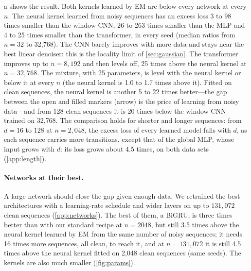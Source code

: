 \documentclass{article}
\begin{document}
a shows the result. Both kernels learned by EM are below every network at every $n$. The neural kernel
learned from noisy sequences has an excess loss 3 to 98 times smaller than the window CNN, 26 to 263 times smaller than
the MLP and 4 to 25 times smaller than the transformer, in every seed (median ratios from $n=32$ to 32{,}768). The CNN
barely improves with more data and stays near the best linear denoiser: this is the locality limit of
\cref{sec:gaussian}. The transformer improves up to $n=8{,}192$ and then levels off, 25 times above the neural kernel at
$n=32{,}768$. The mixture, with 25 parameters, is level with the neural kernel or below it at every $n$ (the neural
kernel is 1.0 to 1.7 times above it). Fitted on clean sequences, the neural kernel is another 5 to 22 times
better---the gap between the open and filled markers (arrow) is the price of learning from noisy data---and from 128
clean sequences it is 20 times below the window CNN trained on 32{,}768. The comparison holds for shorter and longer
sequences: from $d=16$ to $128$ at $n=2{,}048$, the excess loss of every learned model falls with $d$, as each sequence
carries more transitions, except that of the global MLP, whose input grows with $d$: its loss grows about 4.5 times, on
both data sets (\cref{app:length}).

\paragraph{Networks at their best.} A large network should close the gap given enough data. We retrained the best
architectures with a learning-rate schedule and wider layers on up to $131{,}072$ clean sequences (\cref{app:networks}).
The best of them, a BiGRU, is three times better than with our standard recipe at $n=2048$, but still 3.5 times
above the neural kernel learned by EM from the same number of noisy sequences; it needs 16 times more sequences, all
clean, to reach it, and at $n=131{,}072$ it is still 4.5 times above the neural kernel fitted on 2{,}048 clean
sequences (same seeds). The kernels are
also much smaller (\cref{fig:params}).
\end{document}
